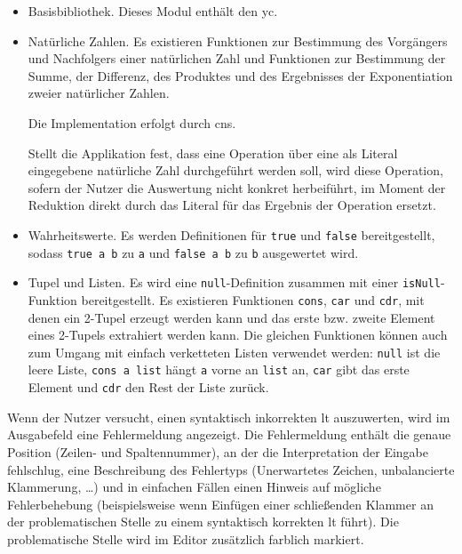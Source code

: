 \documentclass[parskip=full,11pt,twoside]{scrartcl}
\begin{document}
\begin{itemize}
	\item Basisbibliothek. Dieses Modul enthält den \gls{yc}.
	
	\item Natürliche Zahlen. Es existieren Funktionen zur Bestimmung des Vorgängers
	und Nachfolgers einer natürlichen Zahl und Funktionen zur Bestimmung der Summe,
	der Differenz, des Produktes und des Ergebnisses der Exponentiation zweier
	natürlicher Zahlen.
	
	Die Implementation erfolgt durch \glspl{cn}.

	Stellt die Applikation fest, dass eine Operation über eine als Literal
	eingegebene natürliche Zahl durchgeführt werden soll, wird diese Operation, sofern
	der Nutzer die Auswertung nicht konkret herbeiführt, im Moment der Reduktion direkt durch das Literal
	für das Ergebnis der Operation ersetzt.
	
	\item Wahrheitswerte. Es werden Definitionen für \texttt{true} und \texttt{false}
	bereitgestellt, sodass \texttt{true a b} zu \texttt{a} und \texttt{false a b}
	zu \texttt{b} ausgewertet wird.
	
	\item Tupel und Listen. Es wird eine \texttt{null}-Definition zusammen mit einer
	\texttt{isNull}-Funktion bereitgestellt. Es existieren Funktionen
	\texttt{cons}, \texttt{car} und \texttt{cdr}, %
	mit denen ein 2-Tupel erzeugt werden kann und das erste bzw. zweite Element
	eines 2-Tupels extrahiert werden kann. Die gleichen Funktionen können auch zum
	Umgang mit einfach verketteten Listen verwendet werden: \texttt{null} ist die
	leere Liste, \texttt{cons a list} hängt \texttt{a} vorne an \texttt{list} an,
	\texttt{car} gibt das erste Element und \texttt{cdr} den Rest der Liste zurück.
\end{itemize}

Wenn der Nutzer versucht, einen syntaktisch inkorrekten \gls{lt} auszuwerten,
wird im Ausgabefeld eine Fehlermeldung angezeigt. Die Fehlermeldung enthält die genaue Position (Zeilen-
und Spaltennummer), an der die Interpretation der Eingabe fehlschlug, eine Beschreibung
des Fehlertyps (Unerwartetes Zeichen, unbalancierte Klammerung, \ldots) und in einfachen
Fällen einen Hinweis auf mögliche Fehlerbehebung (beispielsweise wenn Einfügen einer
schließenden Klammer an der problematischen Stelle zu einem syntaktisch korrekten
\gls{lt} führt).
Die problematische Stelle wird im Editor zusätzlich farblich markiert.
\end{document}
